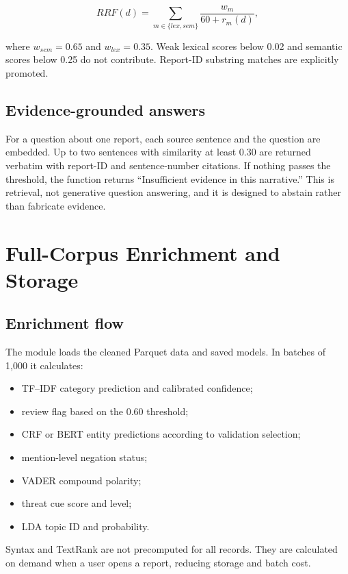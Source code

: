 \documentclass[12pt,a4paper]{report}
\begin{document}
\begin{equation}
RRF(d)=\sum_{m\in\{lex,sem\}}\frac{w_m}{60+r_m(d)},
\end{equation}

where $w_{sem}=0.65$ and $w_{lex}=0.35$. Weak lexical scores below 0.02 and semantic scores below 0.25 do not contribute. Report-ID substring matches are explicitly promoted.

\section{Evidence-grounded answers}

For a question about one report, each source sentence and the question are embedded. Up to two sentences with similarity at least 0.30 are returned verbatim with report-ID and sentence-number citations. If nothing passes the threshold, the function returns ``Insufficient evidence in this narrative.'' This is retrieval, not generative question answering, and it is designed to abstain rather than fabricate evidence.

\chapter{Full-Corpus Enrichment and Storage}

\section{Enrichment flow}

The module  loads the cleaned Parquet data and saved models. In batches of 1,000 it calculates:

\begin{itemize}
  \item TF--IDF category prediction and calibrated confidence;
  \item review flag based on the 0.60 threshold;
  \item CRF or BERT entity predictions according to validation selection;
  \item mention-level negation status;
  \item VADER compound polarity;
  \item threat cue score and level;
  \item LDA topic ID and probability.
\end{itemize}

Syntax and TextRank are not precomputed for all records. They are calculated on demand when a user opens a report, reducing storage and batch cost.
\end{document}
